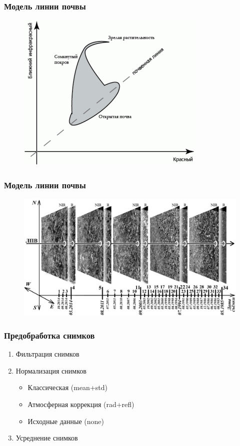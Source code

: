 \documentclass{beamer}
\begin{document}
\begin{frame}
\frametitle{Модель линии почвы}
\begin{figure}[H]
\centering
\includegraphics[width=0.7\linewidth]{imgs/soil_line_model.png}
\end{figure}
\end{frame}

\begin{frame}
\frametitle{Модель линии почвы}
\begin{figure}[H]
\centering
\includegraphics[width=0.7\linewidth]{imgs/soil_line_time.png}
\end{figure}
\end{frame}

\begin{frame}
\frametitle{Предобработка снимков}
\begin{enumerate}
    \item Фильтрация снимков
    \item Нормализация снимков
    \begin{itemize}
        \item Классическая (mean+std)
        \item Атмосферная коррекция (rad+refl)
        \item Исходные данные (none)
    \end{itemize}
    \item Усреднение снимков
\end{enumerate}
\end{frame}
\end{document}
